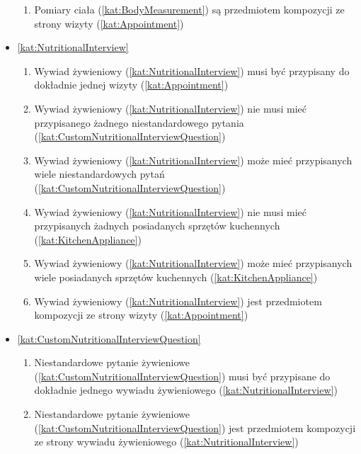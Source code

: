 \begin{itemize}[label={\textbf{Reguły dla}}, wide, labelwidth=!, labelindent=0pt]
\begin{enumerate}[label={\textbf{REG/5/\protect\twodigits{\arabic{enumi}}}}, wide, labelwidth=!, align=left, leftmargin=3cm, resume]
        \item Pomiary ciała (\ref{kat:BodyMeasurement}) są przedmiotem kompozycji ze strony wizyty (\ref{kat:Appointment})
    \end{enumerate}
    \item\ref{kat:NutritionalInterview}\mynobreakpar
    \begin{enumerate}[label={\textbf{REG/5/\protect\twodigits{\arabic{enumi}}}}, wide, labelwidth=!, align=left, leftmargin=3cm, resume]
        \item Wywiad żywieniowy (\ref{kat:NutritionalInterview}) musi być przypisany do dokładnie jednej wizyty (\ref{kat:Appointment})
        \item Wywiad żywieniowy (\ref{kat:NutritionalInterview}) nie musi mieć przypisanego żadnego niestandardowego pytania (\ref{kat:CustomNutritionalInterviewQuestion})
        \item Wywiad żywieniowy (\ref{kat:NutritionalInterview}) może mieć przypisanych wiele niestandardowych pytań (\ref{kat:CustomNutritionalInterviewQuestion})
        \item Wywiad żywieniowy (\ref{kat:NutritionalInterview}) nie musi mieć przypisanych żadnych posiadanych sprzętów kuchennych (\ref{kat:KitchenAppliance})
        \item Wywiad żywieniowy (\ref{kat:NutritionalInterview}) może mieć przypisanych wiele posiadanych sprzętów kuchennych (\ref{kat:KitchenAppliance})
        \item Wywiad żywieniowy (\ref{kat:NutritionalInterview}) jest przedmiotem kompozycji ze strony wizyty (\ref{kat:Appointment})
    \end{enumerate}
    \item\ref{kat:CustomNutritionalInterviewQuestion}\mynobreakpar
    \begin{enumerate}[label={\textbf{REG/5/\protect\twodigits{\arabic{enumi}}}}, wide, labelwidth=!, align=left, leftmargin=3cm, resume]
        \item Niestandardowe pytanie żywieniowe (\ref{kat:CustomNutritionalInterviewQuestion}) musi być przypisane do dokładnie jednego wywiadu żywieniowego (\ref{kat:NutritionalInterview})
        \item Niestandardowe pytanie żywieniowe (\ref{kat:CustomNutritionalInterviewQuestion}) jest przedmiotem kompozycji ze strony wywiadu żywieniowego (\ref{kat:NutritionalInterview})
    \end{enumerate}

\end{itemize}
